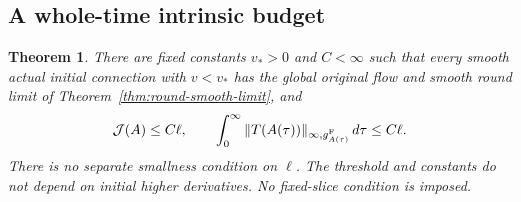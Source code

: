 \documentclass[11pt]{article}
\numberwithin{equation}{section}
\newtheorem{theorem}{Theorem}[section]
\theoremstyle{definition}
\theoremstyle{remark}
\begin{document}
\subsection{A whole-time intrinsic budget}
\label{subsec:whole-intrinsic-endpoint}

\begin{samepage}
\begin{theorem}\label{thm:value-intrinsic-endpoint}
There are fixed constants \(v_*>0\) and \(C<\infty\)
such that every smooth actual initial connection with
\(v<v_*\) has the global original flow and smooth round
limit of Theorem~\ref{thm:round-smooth-limit}, and
\begin{equation}\label{eq:value-intrinsic-budget}
 \mathcal J(A)\le C\ell,\qquad
 \int_0^\infty\|T(A(\tau))\|_{\infty,g^{\rm F}_{A(\tau)}}\,d\tau
                                                        \le C\ell .
\end{equation}
There is no separate smallness condition on \(\ell\).
The threshold and constants do not depend on initial
higher derivatives. No fixed-slice condition is imposed.
\end{theorem}
\end{samepage}
\end{document}
